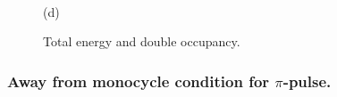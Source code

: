\begin{figure}[h!]
\begin{minipage}[h]{0.5\linewidth}
\end{minipage}
\hfill
\begin{minipage}[h]{0.5\linewidth}
 \\(d)
\end{minipage}
\caption{Total energy and double occupancy.}
\label{fig:Etot_1}
\end{figure}

\clearpage



\subsubsection{Away from monocycle condition for $\pi$-pulse.}



